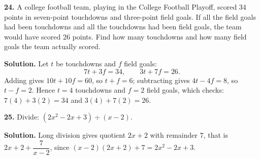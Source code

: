 \documentclass{ximera}
\begin{document}
\begin{problem}

\textbf{24.} A college football team, playing in the College Football Playoff, scored 34
points in seven-point touchdowns and three-point field goals. If all the field goals had
been touchdowns and all the touchdowns had been field goals, the team would have scored
26 points. Find how many touchdowns and how many field goals the team actually scored.

\begin{hint}
\textbf{Solution.} Let $t$ be touchdowns and $f$ field goals:
\[
  7t+3f=34, \qquad 3t+7f=26 .
\]
Adding gives $10t+10f=60$, so $t+f=6$; subtracting gives $4t-4f=8$, so $t-f=2$.
Hence $t=4$ touchdowns and $f=2$ field goals, which checks:
$7(4)+3(2)=34$ and $3(4)+7(2)=26$.
\end{hint}
\end{problem}

\begin{problem}

\textbf{25.} Divide: $\left(2x^{2}-2x+3\right)\div(x-2)$.

\begin{hint}
\textbf{Solution.} Long division gives quotient $2x+2$ with remainder $7$, that is
$2x+2+\dfrac{7}{x-2}$, since $(x-2)(2x+2)+7=2x^{2}-2x+3$.
\end{hint}
\end{problem}
\end{document}

